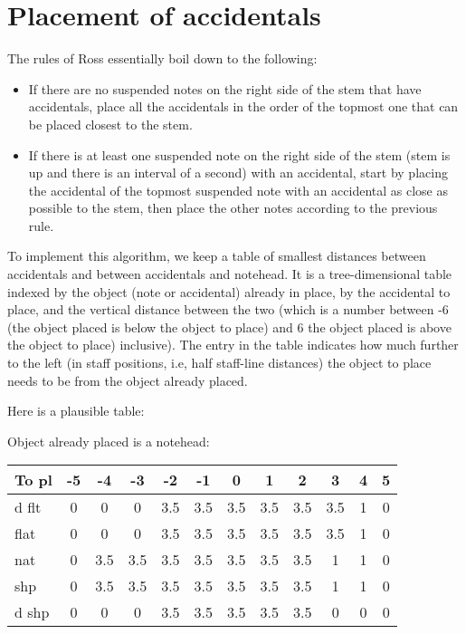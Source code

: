 \chapter{Placement of accidentals}

The rules of Ross essentially boil down to the following: 

\begin{itemize}
\item If there are no suspended notes on the right side of the stem
  that have accidentals, place all the accidentals in the order of the
  topmost one that can be placed closest to the stem.
\item If there is at least one suspended note on the right side of the
  stem (stem is up and there is an interval of a second) with an
  accidental, start by placing the accidental of the topmost suspended
  note with an accidental as close as possible to the stem, then place
  the other notes according to the previous rule.
\end{itemize}

To implement this algorithm, we keep a table of smallest distances
between accidentals and between accidentals and notehead.  It is a
tree-dimensional table indexed by the object (note or accidental)
already in place, by the accidental to place, and the vertical
distance between the two (which is a number between -6 (the object
placed is below the object to place) and 6 the object placed is above
the object to place) inclusive).  The entry in the table indicates how
much further to the left (in staff positions, i.e, half staff-line
distances) the object to place needs to be from the object already
placed.

Here is a plausible table:

Object already placed is a notehead:

{\small\begin{tabular}{|l|c|c|c|c|c|c|c|c|c|c|c|}
\hline
 To pl &  -5 &  -4 &  -3 &  -2 &  -1 &   0 &   1 &   2 &   3 &   4 &   5\\
\hline
 d flt &   0 &   0 &   0 & 3.5 & 3.5 & 3.5 & 3.5 & 3.5 & 3.5 &   1 &   0\\
\hline
  flat &   0 &   0 &   0 & 3.5 & 3.5 & 3.5 & 3.5 & 3.5 & 3.5 &   1 &   0\\
\hline
   nat &   0 & 3.5 & 3.5 & 3.5 & 3.5 & 3.5 & 3.5 & 3.5 &   1 &   1 &   0\\
\hline
   shp &   0 & 3.5 & 3.5 & 3.5 & 3.5 & 3.5 & 3.5 & 3.5 &   1 &   1 &   0\\
\hline
 d shp &   0 &   0 &   0 & 3.5 & 3.5 & 3.5 & 3.5 & 3.5 &   0 &   0 &   0\\
\hline
\end{tabular}}

